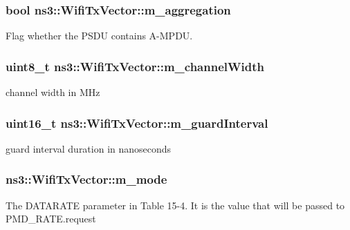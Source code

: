 \subsubsection[{\texorpdfstring{m\+\_\+aggregation}{m_aggregation}}]{\setlength{\rightskip}{0pt plus 5cm}bool ns3\+::\+Wifi\+Tx\+Vector\+::m\+\_\+aggregation\hspace{0.3cm}{\ttfamily [private]}}\hypertarget{classns3_1_1WifiTxVector_a14210b7439931b4c56f87e12356a1a5a}{}\label{classns3_1_1WifiTxVector_a14210b7439931b4c56f87e12356a1a5a}
Flag whether the P\+S\+DU contains A-\/\+M\+P\+DU. 
\subsubsection[{\texorpdfstring{m\+\_\+channel\+Width}{m_channelWidth}}]{\setlength{\rightskip}{0pt plus 5cm}uint8\+\_\+t ns3\+::\+Wifi\+Tx\+Vector\+::m\+\_\+channel\+Width\hspace{0.3cm}{\ttfamily [private]}}\hypertarget{classns3_1_1WifiTxVector_a64807de9a9e72aff0324aec39620e517}{}\label{classns3_1_1WifiTxVector_a64807de9a9e72aff0324aec39620e517}
channel width in M\+Hz 
\subsubsection[{\texorpdfstring{m\+\_\+guard\+Interval}{m_guardInterval}}]{\setlength{\rightskip}{0pt plus 5cm}uint16\+\_\+t ns3\+::\+Wifi\+Tx\+Vector\+::m\+\_\+guard\+Interval\hspace{0.3cm}{\ttfamily [private]}}\hypertarget{classns3_1_1WifiTxVector_a7e9c3a2abd97107113647e67332d0585}{}\label{classns3_1_1WifiTxVector_a7e9c3a2abd97107113647e67332d0585}
guard interval duration in nanoseconds 
\subsubsection[{\texorpdfstring{m\+\_\+mode}{m_mode}}]{ ns3\+::\+Wifi\+Tx\+Vector\+::m\+\_\+mode\hspace{0.3cm}{\ttfamily [private]}}\hypertarget{classns3_1_1WifiTxVector_a3ae4a97ae1c95a7b7d6daed7ddf5a8b7}{}\label{classns3_1_1WifiTxVector_a3ae4a97ae1c95a7b7d6daed7ddf5a8b7}
The D\+A\+T\+A\+R\+A\+TE parameter in Table 15-\/4. It is the value that will be passed to P\+M\+D\+\_\+\+R\+A\+T\+E.\+request 
